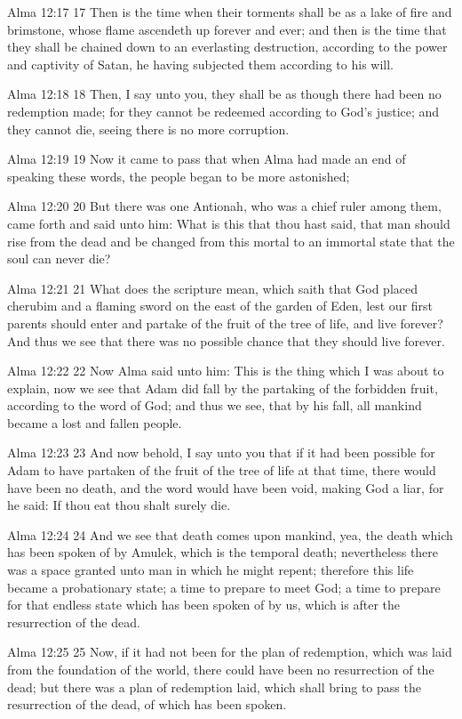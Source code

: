 Alma 12:17
 17 Then is the time when their torments shall be as a lake of
fire and brimstone, whose flame ascendeth up forever and ever;
and then is the time that they shall be chained down to an
everlasting destruction, according to the power and captivity of
Satan, he having subjected them according to his will.

Alma 12:18
 18 Then, I say unto you, they shall be as though there had been
no redemption made; for they cannot be redeemed according to
God's justice; and they cannot die, seeing there is no more
corruption.

Alma 12:19
 19 Now it came to pass that when Alma had made an end of
speaking these words, the people began to be more astonished;

Alma 12:20
 20 But there was one Antionah, who was a chief ruler among them,
came forth and said unto him: What is this that thou hast said,
that man should rise from the dead and be changed from this
mortal to an immortal state that the soul can never die?

Alma 12:21
 21 What does the scripture mean, which saith that God placed
cherubim and a flaming sword on the east of the garden of Eden,
lest our first parents should enter and partake of the fruit of
the tree of life, and live forever? And thus we see that there
was no possible chance that they should live forever.

Alma 12:22
 22 Now Alma said unto him: This is the thing which I was about
to explain, now we see that Adam did fall by the partaking of the
forbidden fruit, according to the word of God; and thus we see,
that by his fall, all mankind became a lost and fallen people.

Alma 12:23
 23 And now behold, I say unto you that if it had been possible
for Adam to have partaken of the fruit of the tree of life at
that time, there would have been no death, and the word would
have been void, making God a liar, for he said: If thou eat thou
shalt surely die.

Alma 12:24
 24 And we see that death comes upon mankind, yea, the death
which has been spoken of by Amulek, which is the temporal death;
nevertheless there was a space granted unto man in which he might
repent; therefore this life became a probationary state; a time
to prepare to meet God; a time to prepare for that endless state
which has been spoken of by us, which is after the resurrection
of the dead.

Alma 12:25
 25 Now, if it had not been for the plan of redemption, which was
laid from the foundation of the world, there could have been no
resurrection of the dead; but there was a plan of redemption
laid, which shall bring to pass the resurrection of the dead, of
which has been spoken.

